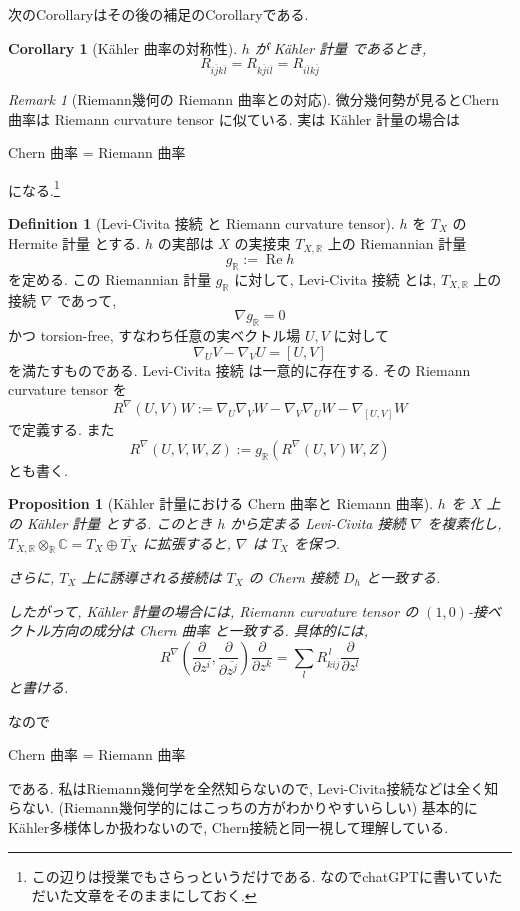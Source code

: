 \documentclass[dvipdfmx,a4paper,11pt]{article} %
\newtheorem{cor}[thm]{Corollary}
\newtheorem{prop}[thm]{Proposition}
\theoremstyle{definition}
\newtheorem{defn}[thm]{Definition}
\theoremstyle{remark}
\newtheorem{rem}[thm]{Remark}
\numberwithin{equation}{section}
\begin{document}
次のCorollaryはその後の補足のCorollaryである. 
\begin{cor}[K\"ahler 曲率の対称性]
\(h\) が K\"ahler 計量 であるとき, 
\[
R_{i \overline{j}k \overline{l}} = 
R_{k \overline{j}i \overline{l}} = 
R_{i \overline{l}k \overline{j}} 
\]
\end{cor}
\begin{rem}[Riemann幾何の Riemann 曲率との対応]
微分幾何勢が見るとChern 曲率は Riemann curvature tensor に似ている. 実は K\"ahler 計量の場合は
\begin{center}
Chern 曲率 = Riemann 曲率
\end{center}
になる.\footnote{この辺りは授業でもさらっというだけである. なのでchatGPTに書いていただいた文章をそのままにしておく. }

\begin{defn}[Levi-Civita 接続 と Riemann curvature tensor]
\(h\) を \(T_X\) の Hermite 計量 とする. \(h\) の実部は \(X\) の実接束 \(T_{X,\mathbb{R}}\) 上の Riemannian 計量
\[
g_{\mathbb{R}}:=\operatorname{Re}h
\]
を定める. この Riemannian 計量 \(g_{\mathbb{R}}\) に対して, Levi-Civita 接続 とは, \(T_{X,\mathbb{R}}\) 上の接続 \(\nabla\) であって,
\[
\nabla g_{\mathbb{R}}=0
\]
かつ torsion-free, すなわち任意の実ベクトル場 \(U,V\) に対して
\[
\nabla_UV-\nabla_VU=[U,V]
\]
を満たすものである. Levi-Civita 接続 は一意的に存在する. その Riemann curvature tensor を
\[
R^\nabla(U,V)W
:=
\nabla_U\nabla_VW-\nabla_V\nabla_UW-\nabla_{[U,V]}W
\]
で定義する. また
\[
R^\nabla(U,V,W,Z)
:=
g_{\mathbb{R}}(R^\nabla(U,V)W,Z)
\]
とも書く.
\end{defn}

\begin{prop}[K\"ahler 計量における Chern 曲率と Riemann 曲率]
\(h\) を \(X\) 上の K\"ahler 計量 とする. このとき \(h\) から定まる Levi-Civita 接続 \(\nabla\) を複素化し, \(T_{X,\mathbb{R}}\otimes_{\mathbb{R}}\mathbb{C}=T_X\oplus \overline{T_X}\) に拡張すると, \(\nabla\) は \(T_X\) を保つ. 

さらに, \(T_X\) 上に誘導される接続は \(T_X\) の Chern 接続 \(D_h\) と一致する. 

したがって, K\"ahler 計量の場合には, Riemann curvature tensor の \((1,0)\)-接ベクトル方向の成分は Chern 曲率 と一致する. 具体的には,
\[
R^\nabla\left(\frac{\partial}{\partial z^i},\frac{\partial}{\partial \overline{z^j}}\right)\frac{\partial}{\partial z^k}
=
\sum_l R_{ki\overline j}^{\,l}\frac{\partial}{\partial z^l}
\]
と書ける.
\end{prop}

なので
\begin{center}
Chern 曲率 = Riemann 曲率
\end{center}
である. 
私はRiemann幾何学を全然知らないので, Levi-Civita接続などは全く知らない. (Riemann幾何学的にはこっちの方がわかりやすいらしい)
基本的にK\"ahler多様体しか扱わないので, Chern接続と同一視して理解している. 
\end{rem}
\end{document}
